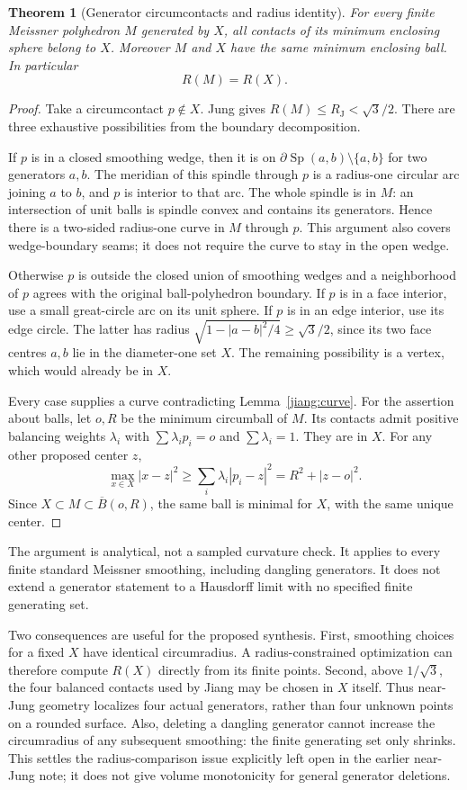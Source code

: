 \documentclass[11pt]{article}
\newtheorem{theorem}{Theorem}[section]
\theoremstyle{remark}\newtheorem{remark}[theorem]{Remark}
\newcommand{\RJ}{R_{\mathrm J}}
\newcommand{\Sp}{\operatorname{Sp}}
\begin{document}
\begin{theorem}[Generator circumcontacts and radius identity]\label{jiang:radius}
For every finite Meissner polyhedron $M$ generated by $X$, all contacts of
its minimum enclosing sphere belong to $X$. Moreover $M$ and $X$ have the
same minimum enclosing ball. In particular
\[
 \boxed{R(M)=R(X).}
\]
\end{theorem}
\begin{proof}
Take a circumcontact $p\notin X$. Jung gives $R(M)\leq\RJ<\sqrt3/2$.
There are three exhaustive possibilities from the boundary decomposition.

If $p$ is in a closed smoothing wedge, then it is on
$\partial\Sp(a,b)\setminus\{a,b\}$ for two generators $a,b$.
The meridian of this spindle through $p$ is a radius-one circular arc
joining $a$ to $b$, and $p$ is interior to that arc. The whole spindle is
in $M$: an intersection of unit balls is spindle convex and contains its
generators. Hence there is a two-sided radius-one curve in $M$ through
$p$. This argument also covers wedge-boundary seams; it does not require
the curve to stay in the open wedge.

Otherwise $p$ is outside the closed union of smoothing wedges and a
neighborhood of $p$ agrees with the original ball-polyhedron boundary.
If $p$ is in a face interior, use a small great-circle arc on its unit
sphere. If $p$ is in an edge interior, use its edge circle. The latter has
radius $\sqrt{1-|a-b|^2/4}\geq\sqrt3/2$, since its two face centres
$a,b$ lie in the diameter-one set $X$. The remaining possibility is a
vertex, which would already be in $X$.

Every case supplies a curve contradicting Lemma~\ref{jiang:curve}.
For the assertion about balls, let $o,R$ be the minimum circumball of
$M$. Its contacts admit positive balancing weights $\lambda_i$ with
$\sum\lambda_i p_i=o$ and $\sum\lambda_i=1$. They are in $X$. For any
other proposed center $z$,
\[
 \max_{x\in X}|x-z|^2\geq\sum_i\lambda_i|p_i-z|^2
 =R^2+|z-o|^2.
\]
Since $X\subset M\subset\overline B(o,R)$, the same ball is minimal for
$X$, with the same unique center.
\end{proof}

The argument is analytical, not a sampled curvature check. It applies to
every finite standard Meissner smoothing, including dangling generators.
It does not extend a generator statement to a Hausdorff limit with no
specified finite generating set.

Two consequences are useful for the proposed synthesis. First, smoothing
choices for a fixed $X$ have identical circumradius. A radius-constrained
optimization can therefore compute $R(X)$ directly from its finite points.
Second, above $1/\sqrt3$, the four balanced contacts used by Jiang may be
chosen in $X$ itself. Thus near-Jung geometry localizes four actual
generators, rather than four unknown points on a rounded surface.
Also, deleting a dangling generator cannot increase the circumradius of
any subsequent smoothing: the finite generating set only shrinks.
This settles the radius-comparison issue explicitly left open in the
earlier near-Jung note; it does not give volume monotonicity for general
generator deletions.
\end{document}
